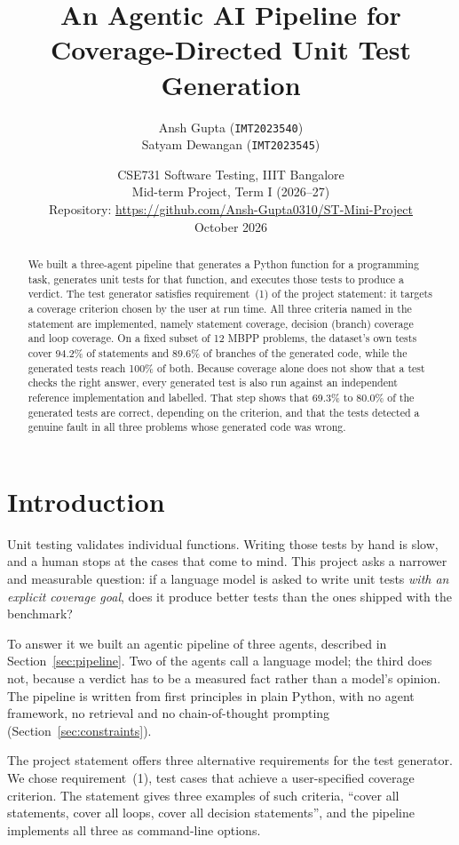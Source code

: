 \documentclass[11pt,a4paper]{article}
\title{An Agentic AI Pipeline for Coverage-Directed Unit Test Generation}
\author{Ansh Gupta (\texttt{IMT2023540}) \\ Satyam Dewangan (\texttt{IMT2023545})}
\date{CSE731 Software Testing, IIIT Bangalore \\ Mid-term Project, Term I (2026--27) \\[6pt]
      Repository: \url{https://github.com/Ansh-Gupta0310/ST-Mini-Project} \\[6pt]
      October 2026}
\begin{document}
\maketitle

\begin{abstract}
\noindent
We built a three-agent pipeline that generates a Python function for a programming task, generates unit tests
for that function, and executes those tests to produce a verdict. The test generator satisfies requirement~(1)
of the project statement: it targets a coverage criterion chosen by the user at run time. All three criteria
named in the statement are implemented, namely statement coverage, decision (branch) coverage and loop
coverage. On a fixed subset of 12 MBPP problems, the dataset's own tests cover 94.2\% of statements and 89.6\%
of branches of the generated code, while the generated tests reach 100\% of both. Because coverage alone does
not show that a test checks the right answer, every generated test is also run against an independent
reference implementation and labelled. That step shows that 69.3\% to 80.0\% of the generated tests are
correct, depending on the criterion, and that the tests detected a genuine fault in all three problems whose
generated code was wrong.
\end{abstract}

\section{Introduction}

Unit testing validates individual functions. Writing those tests by hand is slow, and a human stops at the
cases that come to mind. This project asks a narrower and measurable question: if a language model is asked to
write unit tests \emph{with an explicit coverage goal}, does it produce better tests than the ones shipped with
the benchmark?

To answer it we built an agentic pipeline of three agents, described in Section~\ref{sec:pipeline}. Two of the
agents call a language model; the third does not, because a verdict has to be a measured fact rather than a
model's opinion. The pipeline is written from first principles in plain Python, with no agent framework, no
retrieval and no chain-of-thought prompting (Section~\ref{sec:constraints}).

The project statement offers three alternative requirements for the test generator. We chose
requirement~(1), test cases that achieve a user-specified coverage criterion. The statement gives three
examples of such criteria, ``cover all statements, cover all loops, cover all decision statements'', and the
pipeline implements all three as command-line options.
\end{document}
